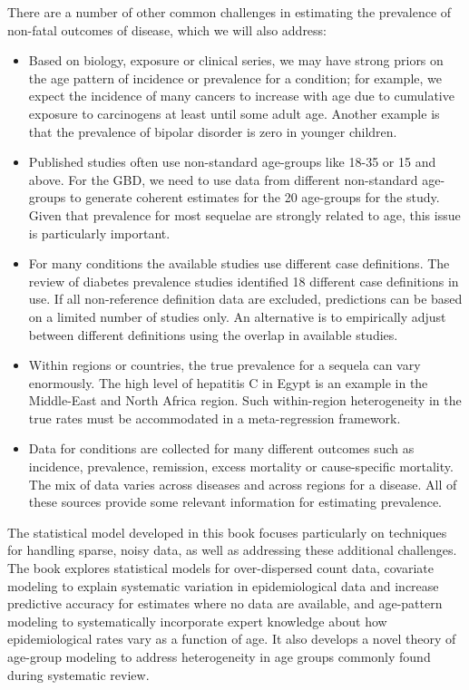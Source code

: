 There are a number of other common challenges in estimating the
prevalence of non-fatal outcomes of disease, which we will also address:
\begin{itemize}
\item Based on biology, exposure or clinical series, we may have strong
priors on the age pattern of incidence or prevalence for a condition;
for example, we expect the incidence of many cancers to increase with
age due to cumulative exposure to carcinogens at least until some
adult age.  Another example is that the prevalence of bipolar disorder is zero in younger children.

\item Published studies often use non-standard age-groups like 18-35
or 15 and above.  For the GBD, we need to use data from different
non-standard age-groups to generate coherent estimates for the 20
age-groups for the study.  Given that prevalence for most sequelae are
strongly related to age, this issue is particularly important.

\item For many conditions the available studies use
different case definitions.  The review of diabetes prevalence studies
identified 18 different case definitions in use.  If all non-reference
definition data are excluded, predictions can be based on a
limited number of studies only.  An alternative is to empirically
adjust between different definitions using the overlap
in available studies.

\item Within regions or
countries, the true prevalence for a sequela can vary enormously. The
high level of hepatitis C in Egypt is an example in the Middle-East
and North Africa region.  Such within-region heterogeneity in the true
rates must be accommodated in a meta-regression framework.

\item Data for conditions are collected for many different outcomes
such as incidence, prevalence, remission, excess mortality or
cause-specific mortality.  The mix of data varies across diseases and
across regions for a disease.  All of these sources provide some
relevant information for estimating prevalence.
\end{itemize}

The statistical model developed in this book focuses
particularly on techniques for handling sparse, noisy data, as well as
addressing these additional challenges.  The book explores statistical
models for over-dispersed count data, covariate modeling to explain
systematic variation in epidemiological data and increase predictive
accuracy for estimates where no data are available, and age-pattern
modeling to systematically incorporate expert knowledge about how
epidemiological rates vary as a function of age.  It also develops a
novel theory of age-group modeling to address heterogeneity in age
groups commonly found during systematic review.

